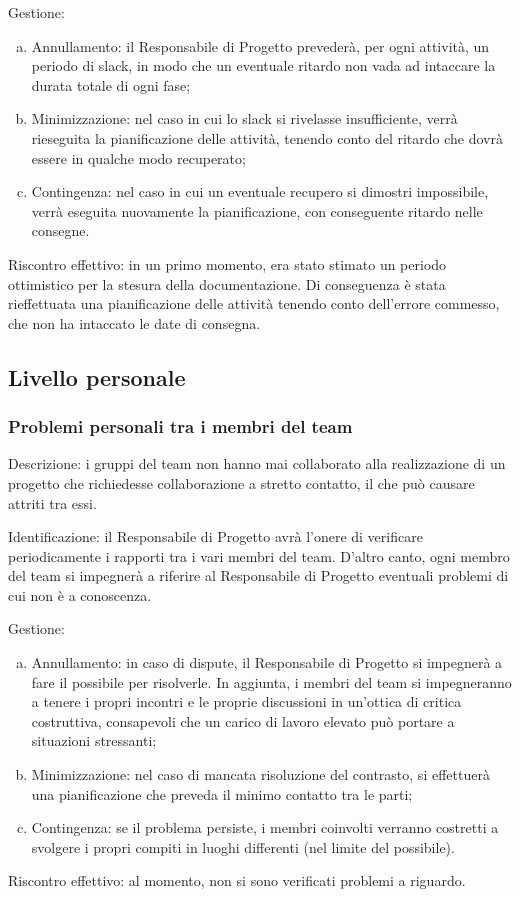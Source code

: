\documentclass[../analisi_dei_rischi.tex]{subfiles}
\begin{document}
	Gestione:
	\begin{enumerate}[(a)]
		\item Annullamento: il Responsabile di Progetto prevederà, per ogni attività, un periodo di slack, in modo che un eventuale ritardo non vada ad intaccare la durata totale di ogni fase;
		\item Minimizzazione: nel caso in cui lo slack si rivelasse insufficiente, verrà rieseguita la pianificazione delle attività, tenendo conto del ritardo che dovrà essere in qualche modo recuperato;
		\item Contingenza: nel caso in cui un eventuale recupero si dimostri impossibile, verrà eseguita nuovamente la pianificazione, con conseguente ritardo nelle consegne.
	\end{enumerate}	
	Riscontro effettivo: in un primo momento, era stato stimato un periodo ottimistico per la stesura della documentazione. Di conseguenza è stata rieffettuata una pianificazione delle attività tenendo conto dell’errore commesso, che non ha intaccato le date di consegna.


\subsection{Livello personale}

\subsubsection{Problemi personali tra i membri del team}
	Descrizione: i gruppi del team non hanno mai collaborato alla realizzazione di un progetto che richiedesse collaborazione a stretto contatto, il che può causare attriti tra essi.
	
	Identificazione: il Responsabile di Progetto avrà l’onere di verificare periodicamente i rapporti tra i vari membri del team. D’altro canto, ogni membro del team si impegnerà a riferire al Responsabile di Progetto eventuali problemi di cui non è a conoscenza.
	
	Gestione:
	\begin{enumerate}[(a)]
		\item Annullamento: in caso di dispute, il Responsabile di Progetto si impegnerà a fare il possibile per risolverle. In aggiunta, i membri del team si impegneranno a tenere i propri incontri e le proprie discussioni in un’ottica di critica costruttiva, consapevoli che un carico di lavoro elevato può portare a situazioni stressanti;
		\item Minimizzazione: nel caso di mancata risoluzione del contrasto, si effettuerà una pianificazione che preveda il minimo contatto tra le parti; 
		\item Contingenza: se il problema persiste, i membri coinvolti verranno costretti a svolgere i propri compiti in luoghi differenti (nel limite del possibile).
	\end{enumerate}	
	Riscontro effettivo: al momento, non si sono verificati problemi a riguardo.
\end{document}
